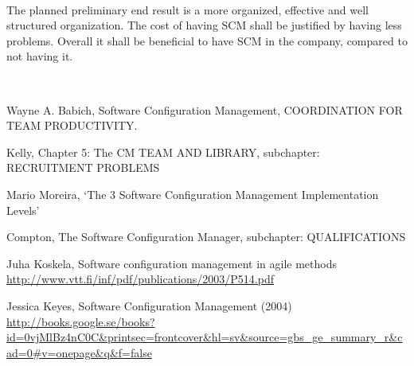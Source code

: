 \documentclass{article}
\begin{document}
\mbox{} \\
The planned preliminary end result is a more organized, effective and well structured organization. The cost of having SCM shall be justified by having less problems. Overall it shall be beneficial to have SCM in the company, compared to not having it.

\mbox{} \\
\begin{thebibliography}{1}
 Wayne A. Babich, Software Configuration Management, COORDINATION FOR TEAM PRODUCTIVITY.

 Kelly, Chapter 5: The CM TEAM AND LIBRARY, subchapter: RECRUITMENT PROBLEMS 

 Mario Moreira, ‘The 3 Software Configuration Management Implementation Levels’

Compton, The Software Configuration Manager, subchapter: QUALIFICATIONS

Juha Koskela, Software configuration management in agile methods
\url{http://www.vtt.fi/inf/pdf/publications/2003/P514.pdf}

 Jessica Keyes, Software Configuration Management (2004) \url{http://books.google.se/books?id=0vjMlBz4nC0C&printsec=frontcover&hl=sv&source=gbs_ge_summary_r&cad=0#v=onepage&q&f=false}
\end{thebibliography}
\end{document}
